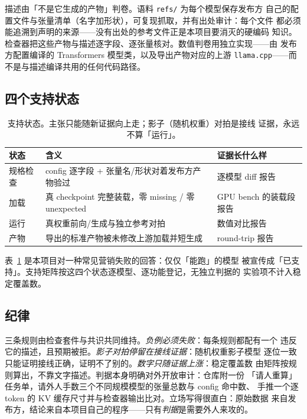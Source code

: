 \documentclass[11pt,a4paper]{ctexart}
\newcommand{\code}[1]{\texttt{#1}}
\begin{document}
描述由「不是它生成的产物」判卷。语料 \code{refs/} 为每个模型保存发布方
自己的配置文件与张量清单（名字加形状），可复现抓取，并有出处审计：每个文件
都必须能追溯到声明的来源——没有出处的参考文件正是本项目要消灭的硬编码
知识。检查器把这些产物与描述逐字段、逐张量核对。数值判卷用独立实现——由
发布方配置编译的 Transformers 模型类，以及导出产物对应的上游
\code{llama.cpp}——而不是与描述编译共用的任何代码路径。

\subsection{四个支持状态}

\begin{table}[t]
\centering\small
\caption{支持状态。主张只能随新证据向上走；影子（随机权重）对拍是接线
证据，永远不算「运行」。}
\label{tab:states}
\begin{tabular}{@{}p{2.2cm}p{5.4cm}p{5.2cm}@{}}
\toprule
状态 & 含义 & 证据长什么样 \\
\midrule
规格检查 & config 逐字段 + 张量名/形状对着发布方产物验过 & 逐模型 diff 报告 \\
加载 & 真 checkpoint 完整装载，零 missing / 零 unexpected & GPU bench 的装载段报告 \\
运行 & 真权重前向/生成与独立参考对拍 & 数值对比报告 \\
产物 & 导出的标准产物被未修改上游加载并短生成 & round-trip 报告 \\
\bottomrule
\end{tabular}
\end{table}

表~\ref{tab:states} 是本项目对一种常见营销失败的回答：仅仅「能跑」的模型
被宣传成「已支持」。支持矩阵按这四个状态逐模型、逐功能登记，无独立判据的
实验项不计入稳定覆盖数。

\subsection{纪律}

三条规则由检查套件与共识共同维持。\emph{负例必须失败}：每条规则都配有一个
违反它的描述，且预期被拒。\emph{影子对拍停留在接线证据}：随机权重影子模型
逐位一致只能证明接线正确，证明不了别的。\emph{数字只随证据上涨}：稳定覆盖数
由矩阵按规则算出，不靠文字描述。判据本身明确对外开放审计：仓库附一份
「请人重算」任务单，请外人手数三个不同规模模型的张量总数与 config 命中数、
手推一个逐 token 的 KV 缓存尺寸并与检查器输出比对。立场写得很直白：原始数据
来自发布方，结论来自本项目自己的程序——只有\emph{判据}是需要外人来攻的。
\end{document}
